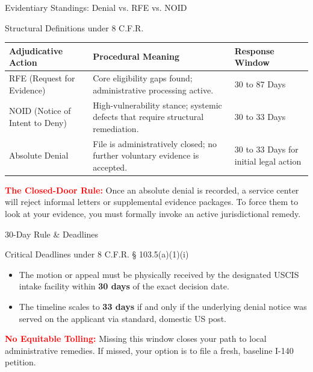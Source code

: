 \documentclass[11pt]{beamer}
\begin{document}
	\begin{frame}{Evidentiary Standings: Denial vs. RFE vs. NOID}
		\scriptsize
		\begin{block}{Structural Definitions under 8 C.F.R.}
			\centering
			\begin{tabular}{|p{3cm}|p{5cm}|p{2.5cm}|}
				\hline
				\textbf{Adjudicative Action} & \textbf{Procedural Meaning} & \textbf{Response Window} \\
				\hline
				RFE (Request for Evidence) & Core eligibility gaps found; administrative processing active. & 30 to 87 Days \\
				\hline
				NOID (Notice of Intent to Deny) & High-vulnerability stance; systemic defects that require structural remediation. & 30 to 33 Days \\
				\hline
				Absolute Denial & File is administratively closed; no further voluntary evidence is accepted. & 30 to 33 Days for initial legal action \\
				\hline
			\end{tabular}
			\vspace{0.2cm}
			\flushleft \textcolor{red}{\textbf{The Closed-Door Rule:}} Once an absolute denial is recorded, a service center will reject informal letters or supplemental evidence packages. To force them to look at your evidence, you must formally invoke an active jurisdictional remedy.
		\end{block}
	\end{frame}
	
	
	\begin{frame}{30-Day Rule \& Deadlines}
		\scriptsize
		\begin{block}{Critical Deadlines under 8 C.F.R. § 103.5(a)(1)(i)}
			\begin{itemize}
				\item The motion or appeal must be physically received by the designated USCIS intake facility within \textbf{30 days} of the exact decision date.
				\item The timeline scales to \textbf{33 days} if and only if the underlying denial notice was served on the applicant via standard, domestic US post.
			\end{itemize}
			\textcolor{red}{\textbf{No Equitable Tolling:}} Missing this window closes your path to local administrative remedies. If missed, your option is to file a fresh, baseline I-140 petition.
		\end{block}
	\end{frame}
	
\end{document}
